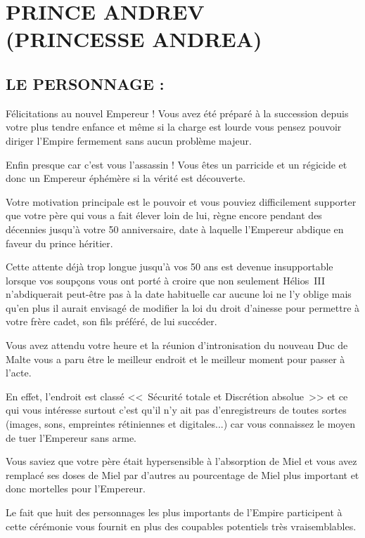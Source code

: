\documentclass[14pt,twocolumn]{extarticle}
\begin{document}
\section{PRINCE ANDREV\\(PRINCESSE ANDREA)}

\subsection{LE PERSONNAGE :}

Félicitations au nouvel Empereur ! Vous avez été préparé à la succession depuis
votre plus tendre enfance et même si la charge est lourde vous pensez pouvoir
diriger l'Empire fermement sans aucun problème majeur.

Enfin presque car c'est vous l'assassin ! Vous êtes un parricide et un régicide
et donc un Empereur éphémère si la vérité est découverte.

Votre motivation principale est le pouvoir et vous pouviez difficilement
supporter que votre père qui vous a fait élever loin de lui, règne encore
pendant des décennies jusqu'à votre 50 anniversaire, date à laquelle 
l'Empereur abdique en faveur du prince héritier.

Cette attente déjà trop longue jusqu'à vos 50 ans est devenue insupportable
lorsque vos soupçons vous ont porté à croire que non seulement Hélios~III
n'abdiquerait peut-être pas à la date habituelle car aucune loi ne l'y oblige
mais qu'en plus il aurait envisagé de modifier la loi du droit d'ainesse pour
permettre à votre frère cadet, son fils préféré, de lui succéder.

Vous avez attendu votre heure et la réunion d'intronisation du nouveau Duc de
Malte vous a paru être le meilleur endroit et le meilleur moment pour passer à
l'acte.

En effet, l'endroit est classé <<~Sécurité totale et Discrétion absolue~>> et
ce qui vous intéresse surtout c'est qu'il n'y ait pas d'enregistreurs de toutes
sortes (images, sons, empreintes rétiniennes et digitales...) car vous
connaissez le moyen de tuer l'Empereur sans arme.

Vous saviez que votre père était hypersensible à l'absorption de Miel et vous
avez remplacé ses doses de Miel par d'autres au pourcentage de Miel plus
important et donc mortelles pour l'Empereur.

Le fait que huit des personnages les plus importants de l'Empire participent à
cette cérémonie vous fournit en plus des coupables potentiels très
vraisemblables.
\end{document}

